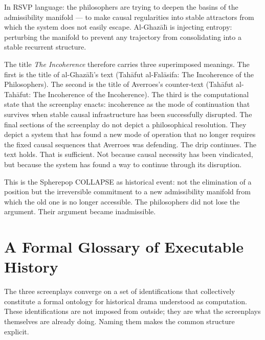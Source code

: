 \documentclass[11pt, a4paper]{article}
\theoremstyle{definition}
\theoremstyle{remark}
\begin{document}
In RSVP language: the philosophers are trying to deepen the basins of the
admissibility manifold --- to make causal regularities into stable attractors
from which the system does not easily escape. Al-Ghaz\={a}l{\=\i} is injecting
entropy: perturbing the manifold to prevent any trajectory from consolidating
into a stable recurrent structure.

The title \textit{The Incoherence} therefore carries three superimposed meanings.
The first is the title of al-Ghaz\={a}l{\=\i}'s text (Tah\={a}fut al-Fal\={a}sifa:
The Incoherence of the Philosophers). The second is the title of Averroes's
counter-text (Tah\={a}fut al-Tah\={a}fut: The Incoherence of the Incoherence).
The third is the computational state that the screenplay enacts: incoherence as
the mode of continuation that survives when stable causal infrastructure has
been successfully disrupted. The final sections of the screenplay do not depict
a philosophical resolution. They depict a system that has found a new mode of
operation that no longer requires the fixed causal sequences that Averroes was
defending. The drip continues. The text holds. That is sufficient. Not because
causal necessity has been vindicated, but because the system has found a way to
continue through its disruption.

This is the Spherepop COLLAPSE as historical event: not the elimination of a
position but the irreversible commitment to a new admissibility manifold from
which the old one is no longer accessible. The philosophers did not lose the
argument. Their argument became inadmissible.

\section{A Formal Glossary of Executable History}

The three screenplays converge on a set of identifications that collectively
constitute a formal ontology for historical drama understood as computation.
These identifications are not imposed from outside; they are what the screenplays
themselves are already doing. Naming them makes the common structure explicit.
\end{document}
